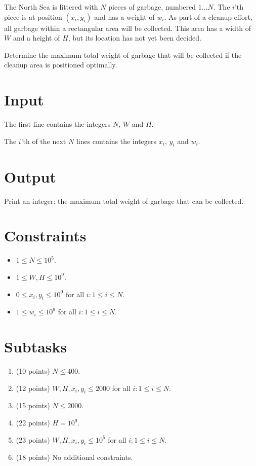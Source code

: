 
The North Sea is littered with $N$ pieces of garbage, numbered $1 \dots N$.
The $i$'th piece is at position $(x_i, y_i)$ and has a weight of $w_i$.
As part of a cleanup effort, all garbage within a rectangular area will be collected.
This area has a width of $W$ and a height of $H$, but its location has not yet been decided.

Determine the maximum total weight of garbage that will be collected if the cleanup area is positioned optimally.

\section*{Input}
The first line contains the integers $N$, $W$ and $H$.

The $i$'th of the next $N$ lines contains the integers $x_i$, $y_i$ and $w_i$.

\section*{Output}
Print an integer: the maximum total weight of garbage that can be collected.

\section*{Constraints}
\begin{itemize}
  \item $1 \le N \le 10^5$.
  \item $1 \le W, H \le 10^9$.
  \item $0 \le x_i, y_i \le 10^9$ for all $i : 1 \le i \le N$.
  \item $1 \le w_i \le 10^9$ for all $i : 1 \le i \le N$.
\end{itemize}

\section*{Subtasks}
\begin{enumerate}
  \item (10 points) $N \le 400$.
  \item (12 points) $W, H, x_i, y_i \le 2000$ for all $i : 1 \le i \le N$.
  \item (15 points) $N \le 2000$.
  \item (22 points) $H = 10^9$.
  \item (23 points) $W, H, x_i, y_i \le 10^5$ for all $i : 1 \le i \le N$.
  \item (18 points) No additional constraints.
\end{enumerate}

